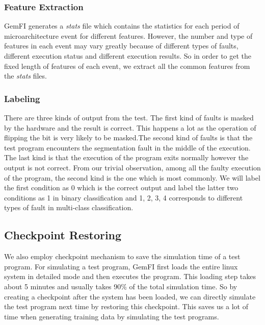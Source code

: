 \subsubsection{Feature Extraction}
GemFI generates a \emph{stats} file which contains the statistics for each period of microarchitecture event for different features. However, the number and type of features in each event may vary greatly because of different types of faults, different execution status and different execution results. So in order to get the fixed length of features of each event, we extract all the common features from the \emph{stats} files. 
\subsubsection{Labeling}
There are three kinds of output from the test. The first kind of faults is masked by the hardware and the result is correct. This happens a lot as the operation of flipping the bit is very likely to be masked.The second kind of faults is that the test program encounters the segmentation fault in the middle of the execution. The last kind is that the execution of the program exits normally however the output is not correct. From our trivial observation, among all the faulty execution of the program, the second kind is the one which is most commonly. We will label the first condition as 0 which is the correct output and label the latter two conditions as 1 in binary classification and 1, 2, 3, 4 corresponds to different types of fault in multi-class classification.

\subsection{Checkpoint Restoring}
We also employ checkpoint mechanism to save the simulation time of a test program. For simulating a test program, GemFI first loads the entire linux system in detailed mode and then executes the program. This loading step takes about 5 minutes and usually takes 90\% of the total simulation time. So by creating a checkpoint after the system has been loaded, we can directly simulate the test program next time by restoring this checkpoint. This saves us a lot of time when generating training data by simulating the test programs. 


